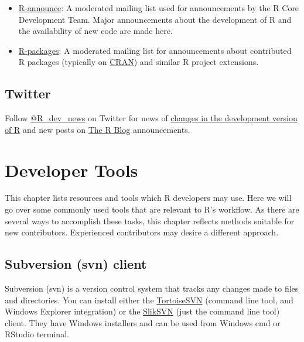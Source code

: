 \documentclass[
  letterpaper,
  DIV=11,
  numbers=noendperiod]{scrreprt}
\providecommand{\tightlist}{%
  \setlength{\itemsep}{0pt}\setlength{\parskip}{0pt}}\usepackage{longtable,booktabs,array}
\begin{document}
\begin{itemize}
\tightlist
\item
  \href{https://stat.ethz.ch/mailman/listinfo/r-announce}{R-announce}: A
  moderated mailing list used for announcements by the R Core
  Development Team. Major announcements about the development of R and
  the availability of new code are made here.
\item
  \href{https://stat.ethz.ch/mailman/listinfo/r-packages}{R-packages}: A
  moderated mailing list for announcements about contributed R packages
  (typically on \href{https://cran.r-project.org/}{CRAN}) and similar R
  project extensions.
\end{itemize}

\section{Twitter}\label{twitter}

Follow \href{https://twitter.com/R_dev_news}{@R\_dev\_news} on Twitter
for news of \href{https://developer.r-project.org/RSSfeeds.html}{changes
in the development version of R} and new posts on
\href{https://blog.r-project.org/}{The R Blog} announcements.


\chapter{Developer Tools}\label{DevTools}

This chapter lists resources and tools which R developers may use. Here
we will go over some commonly used tools that are relevant to R's
workflow. As there are several ways to accomplish these tasks, this
chapter reflects methods suitable for new contributors. Experienced
contributors may desire a different approach.

\section{Subversion (svn) client}\label{subversion-svn-client}

Subversion (svn) is a version control system that tracks any changes
made to files and directories. You can install either the
\href{https://tortoisesvn.net/}{TortoiseSVN} (command line tool, and
Windows Explorer integration) or the
\href{https://sliksvn.com/download/}{SlikSVN} (just the command line
tool) client. They have Windows installers and can be used from Windows
cmd or RStudio terminal.
\end{document}
